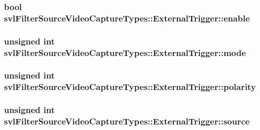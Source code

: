 \subsubsection[{enable}]{\setlength{\rightskip}{0pt plus 5cm}bool svl\+Filter\+Source\+Video\+Capture\+Types\+::\+External\+Trigger\+::enable}\label{classsvl_filter_source_video_capture_types_1_1_external_trigger_a79a0e5652f004b6b16f759d680bc9e55}
\hypertarget{classsvl_filter_source_video_capture_types_1_1_external_trigger_ad847cfd7b8858f3e55c4933e0e794eab}{}
\subsubsection[{mode}]{\setlength{\rightskip}{0pt plus 5cm}unsigned int svl\+Filter\+Source\+Video\+Capture\+Types\+::\+External\+Trigger\+::mode}\label{classsvl_filter_source_video_capture_types_1_1_external_trigger_ad847cfd7b8858f3e55c4933e0e794eab}
\hypertarget{classsvl_filter_source_video_capture_types_1_1_external_trigger_a133a895468d169b381e343f3954e81fb}{}
\subsubsection[{polarity}]{\setlength{\rightskip}{0pt plus 5cm}unsigned int svl\+Filter\+Source\+Video\+Capture\+Types\+::\+External\+Trigger\+::polarity}\label{classsvl_filter_source_video_capture_types_1_1_external_trigger_a133a895468d169b381e343f3954e81fb}
\hypertarget{classsvl_filter_source_video_capture_types_1_1_external_trigger_a90c5c2fc64176eb2220cdd9890795301}{}
\subsubsection[{source}]{\setlength{\rightskip}{0pt plus 5cm}unsigned int svl\+Filter\+Source\+Video\+Capture\+Types\+::\+External\+Trigger\+::source}\label{classsvl_filter_source_video_capture_types_1_1_external_trigger_a90c5c2fc64176eb2220cdd9890795301}


